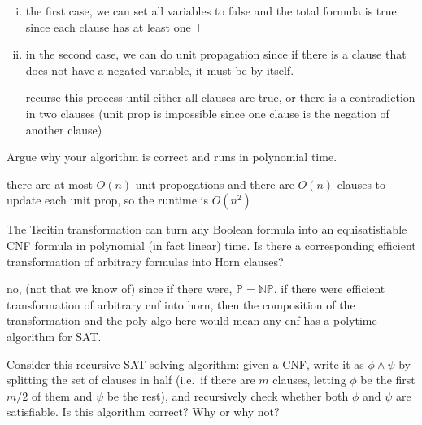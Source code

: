 \documentclass[11pt]{article}
\begin{document}
\begin{qunlist}
\begin{qparts}
\begin{answer}
      \begin{enumerate}[i.]
        \item the first case, we can set all variables to false and the total formula is true since each clause has at least one \(\top\)

        \item in the second case, we can do unit propagation since if there is a clause that does not have a negated variable, it must be by itself.

          recurse this process until either all clauses are true, or there is a contradiction in two clauses (unit prop is impossible since one clause is the negation of another clause)
      \end{enumerate}
    \end{answer}

  \item
    Argue why your algorithm is correct and runs in polynomial time.

    \begin{answer}
      there are at most \(O(n)\) unit propogations and there are \(O(n) \) clauses to update each unit prop, so the runtime is \(O(n^2)\)
    \end{answer}

  \item
    The Tseitin transformation can turn any Boolean formula into an equisatisfiable CNF formula in polynomial (in fact linear) time.
    Is there a corresponding efficient transformation of arbitrary formulas into Horn clauses?

    \begin{answer}
      no, (not that we know of) since if there were, \(\mathbb P = \mathbb{NP}\). if there were efficient transformation of arbitrary cnf into horn, then the composition of the transformation and the poly algo here would mean any cnf has a polytime algorithm for SAT.
    \end{answer}
  \end{qparts}

  \begin{qparts}
  \item
    Consider this recursive SAT solving algorithm: given a CNF, write it as $\phi \land \psi$ by splitting the set of clauses in half (i.e.~if there are $m$ clauses, letting $\phi$ be the first $m/2$ of them and $\psi$ be the rest), and recursively check whether both $\phi$ and $\psi$ are satisfiable.
    Is this algorithm correct?
    Why or why not?


\end{qparts}
\end{qunlist}
\end{document}
